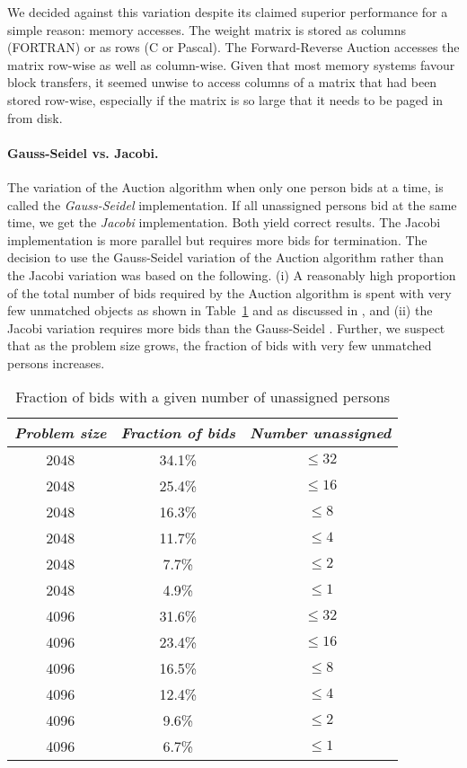 We decided against this variation despite its claimed superior
performance \cite{ca91} for a simple reason: memory accesses.
The weight matrix is stored as columns (FORTRAN) or as rows (C or Pascal).
The Forward-Reverse Auction accesses the matrix row-wise as well
as column-wise.  Given that most memory systems favour block transfers,
it seemed unwise to access columns of a matrix that had been stored
row-wise, especially if the matrix is so large that it needs to be paged
in from disk.

\paragraph{Gauss-Seidel vs. Jacobi.}
The variation of the Auction algorithm when
only one person bids at a time, is called the {\em Gauss-Seidel}
implementation. If all unassigned persons bid at the same time,
we get the {\em Jacobi} implementation. Both yield correct results.
The Jacobi implementation is more parallel but requires
more bids for termination.
The decision to use the Gauss-Seidel variation of the Auction
algorithm rather than the Jacobi variation was based on the following.
(i) A reasonably high proportion of the total number of bids required 
by the Auction algorithm is spent with very few unmatched objects as
shown in Table~\ref{many_bids_for_few} and as discussed in 
\cite{weze91,beca89}, and 
(ii) the Jacobi variation requires more bids than the Gauss-Seidel
\cite{weze91,beca89}. Further, we suspect that as the problem size
grows, the fraction of bids with very few unmatched persons increases.

\begin{table}
\begin{center}
\begin{tabular}{|c|c|c|} \hline \hline
{\em Problem size }        & {\em Fraction of bids } & {\em Number unassigned} \\ \hline
2048	&	34.1\%	& $\leq 32$ 	\\ \hline
2048	&	25.4\%	& $\leq 16$ 	\\ \hline
2048	&	16.3\%	& $\leq  8$ 	\\ \hline
2048	&	11.7\%	& $\leq  4$ 	\\ \hline
2048	&	7.7\%	& $\leq  2$ 	\\ \hline
2048	&	4.9\%	& $\leq  1$ 	\\ \hline \hline
4096	&	31.6\%	& $\leq 32$ 	\\ \hline
4096	&	23.4\%	& $\leq 16$ 	\\ \hline
4096	&	16.5\%	& $\leq  8$ 	\\ \hline
4096	&	12.4\%	& $\leq  4$ 	\\ \hline
4096	&	9.6\%	& $\leq  2$ 	\\ \hline
4096	&	6.7\%	& $\leq  1$ 	\\ \hline \hline
\end{tabular}
\end{center}
\caption{Fraction of bids with a given number of unassigned persons}
\label{many_bids_for_few}
\end{table}

